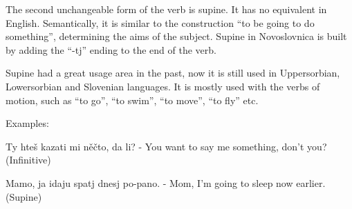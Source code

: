 The second unchangeable form of the verb is supine. It has no equivalent in English. Semantically, it is similar to the construction “to be going to do something”, determining the aims of the subject. Supine in Novoslovnica is built by adding the “-tj” ending to the end of the verb.

Supine had a great usage area in the past, now it is still used in Uppersorbian, Lowersorbian and Slovenian languages. It is mostly used with the verbs of motion, such as “to go”, “to swim”, “to move”, “to fly” etc.

Examples:

Ty hteš kazati mi něčto, da li? - You want to say me something, don’t you? (Infinitive)

Mamo, ja idaju spatj dnesj po-pano. - Mom, I’m going to sleep now earlier. (Supine)

% 


